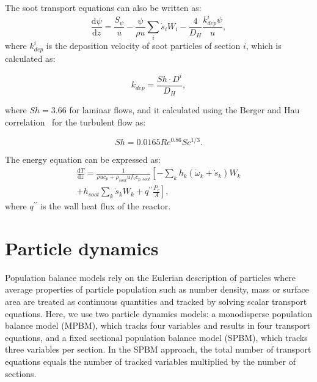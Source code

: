  The soot transport equations can also be written as:
\begin{equation}
	\frac{\mathrm{d} \psi}{\mathrm{d} z}=
	\frac{S_{\psi}}{u}
	-\frac{\psi}{\rho u}\sum_i \dot{s}_i W_i
	-\frac{4}{D_H}\frac{k^i_{dep}\psi}{u},
	\label{eqn:sootpfr}
\end{equation}
\noindent where $k^i_{dep}$ is the deposition velocity of soot particles of section $i$, which is calculated as:

\begin{equation}
	k_{dep}=
	\frac{Sh\cdot D^i}{D_H},
	\label{eqn:kdep}
\end{equation}

\noindent where $Sh=3.66$ for laminar flows, and it calculated using the Berger and Hau correlation~\citep{berger1977mass} for the turbulent flow as:

\begin{equation}
	Sh=
	0.0165Re^{0.86} Sc^{1/3}
	\label{eqn:shdep}.
\end{equation}

The energy equation can be expressed as:
\begin{equation}
	\begin{split}
		\frac{\mathrm{d} T}{\mathrm{d} z}=
		\frac{1}{\rho u c_p+\rho_{soot} u f_v 	c_{p,soot}}
		\left[
			-\sum_k h_k
			\left(
			\dot{\omega}_k+\dot{s}_k
			\right) W_k
		\right. \\
		\left.
			+h_{soot}\sum_k \dot{s}_k W_k
			+q^{\prime \prime}\frac{P_c}{A}
		\right],
	\end{split}
	\label{eqn:energypfr}
\end{equation}
\noindent where $q^{\prime \prime}$ is the wall heat flux of the reactor.



\section{Particle dynamics}
\label{sec:particledynamics}
Population balance models rely on the Eulerian description of particles where average properties of particle population such as number density, mass or surface area are treated as continuous quantities and tracked by solving scalar transport equations. Here, we use two particle dynamics models: a monodisperse population balance model (MPBM), which tracks four variables and results in four transport equations, and a fixed sectional population balance model (SPBM), which tracks three variables per section. In the SPBM approach, the total number of transport equations equals the number of tracked variables multiplied by the number of sections. 

